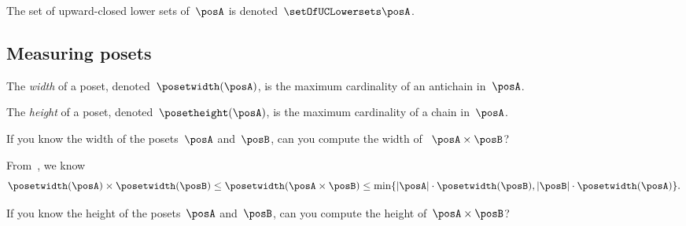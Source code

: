 The set of upward-closed lower sets of~$\posA$ is denoted~$\setOfUCLowersets \posA$.

\subsection{Measuring posets}
\begin{definition}
  \label{def:poset-width}
  The \emph{width} of a poset, denoted~$\posetwidth(\posA)$, is the maximum cardinality of an antichain in~$\posA$.
\end{definition}

\begin{definition}
  \label{def:poset-height}
  The \emph{height} of a poset, denoted~$\posetheight(\posA)$, is the maximum cardinality of a chain in~$\posA$.
\end{definition}

\begin{exercise}\label{ex:width}
  If you know the width of the posets~$\posA$ and~$\posB$, can you compute the width of ~$\posA\times\posB$?
\end{exercise}
\begin{solution}
  From~\cite{bezrukovantichains}, we know
  \begin{equation*}
    \posetwidth(\posA)\times \posetwidth(\posB)\leq \posetwidth(\posA\times \posB)\leq \min \{ \vert \posA\vert \cdot \posetwidth(\posB),\vert \posB \vert \cdot \posetwidth(\posA)\}.
  \end{equation*}
\end{solution}

\begin{exercise}\label{ex:height}
  If you know the height of the posets~$\posA$ and~$\posB$, can you compute the height of~$\posA\times\posB$?
\end{exercise}

